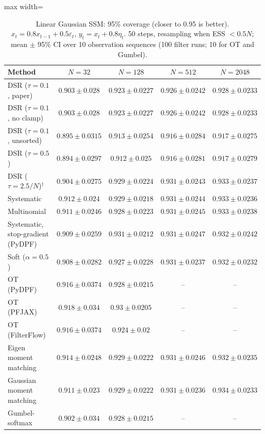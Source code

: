 \begin{table}[H]
\centering
\small
\caption{Linear Gaussian SSM: 95\% coverage (closer to 0.95 is better). $x_t=0.8x_{t-1}+0.5\varepsilon_t$, $y_t=x_t+0.8\eta_t$. 50 steps, resampling when ESS $<0.5N$; mean $\pm$ 95\% CI over 10 observation sequences (100 filter runs; 10 for OT and Gumbel).}
\label{tab:linear-coverage95}
\begin{adjustbox}{max width=\linewidth}
\begin{tabular}{lcccc}
\toprule
Method & $N{=}32$ & $N{=}128$ & $N{=}512$ & $N{=}2048$ \\
\midrule
DSR ($\tau{=}0.1$, paper) & $0.903\pm0.028$ & $0.923\pm0.0227$ & $0.926\pm0.0242$ & $0.928\pm0.0233$ \\
DSR ($\tau{=}0.1$, no clamp) & $0.903\pm0.028$ & $0.923\pm0.0227$ & $0.926\pm0.0242$ & $0.928\pm0.0233$ \\
DSR ($\tau{=}0.1$, unsorted) & $0.895\pm0.0315$ & $0.913\pm0.0254$ & $0.916\pm0.0284$ & $0.917\pm0.0275$ \\
DSR ($\tau{=}0.5$) & $0.894\pm0.0297$ & $0.912\pm0.025$ & $0.916\pm0.0281$ & $0.917\pm0.0279$ \\
DSR ($\tau{=}2.5/N$)$^\dagger$ & $0.904\pm0.0275$ & $0.929\pm0.0224$ & $0.931\pm0.0243$ & $0.933\pm0.0237$ \\
\midrule
Systematic & $0.912\pm0.024$ & $0.929\pm0.0218$ & $0.931\pm0.0244$ & $0.933\pm0.0236$ \\
Multinomial & $0.911\pm0.0246$ & $0.928\pm0.0223$ & $\mathbf{0.931\pm0.0245}$ & $0.933\pm0.0238$ \\
Systematic, stop-gradient (PyDPF) & $0.909\pm0.0259$ & $\mathbf{0.931\pm0.0212}$ & $0.931\pm0.0247$ & $0.932\pm0.0242$ \\
Soft ($\alpha{=}0.5$) & $0.908\pm0.0282$ & $0.927\pm0.0228$ & $0.931\pm0.0237$ & $0.932\pm0.0232$ \\
OT (PyDPF) & $0.916\pm0.0374$ & $0.928\pm0.0215$ & -- & -- \\
OT (PFJAX) & $\mathbf{0.918\pm0.034}$ & $0.93\pm0.0205$ & -- & -- \\
OT (FilterFlow) & $0.916\pm0.0374$ & $0.924\pm0.02$ & -- & -- \\
Eigen moment matching & $0.914\pm0.0248$ & $0.929\pm0.0222$ & $0.931\pm0.0246$ & $0.932\pm0.0235$ \\
Gaussian moment matching & $0.911\pm0.023$ & $0.929\pm0.0222$ & $\mathbf{0.931\pm0.0236}$ & $\mathbf{0.934\pm0.0233}$ \\
Gumbel-softmax & $0.902\pm0.034$ & $0.928\pm0.0215$ & -- & -- \\

\end{tabular}
\end{adjustbox}
\end{table}
